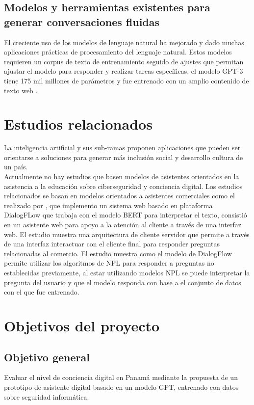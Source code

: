 \subsection{Modelos y herramientas existentes para generar conversaciones fluidas}\label{section: Revisión de la literatura}
El creciente uso de los modelos de lenguaje natural ha mejorado y dado muchas aplicaciones prácticas de procesamiento del lenguaje natural. Estos modelos requieren un corpus de texto de entrenamiento seguido de ajustes que permitan ajustar el modelo para responder y realizar tareas específicas, el modelo GPT-3 tiene 175 mil millones de parámetros y fue entrenado con un amplio contenido de texto web \cite{Autor-Nacional}.  
\section{Estudios relacionados}\label{section: Estudios relacionados}
La inteligencia artificial y sus sub-ramas proponen aplicaciones que pueden ser orientarse a soluciones para generar más inclusión social y desarrollo cultura de un país. \\
Actualmente no hay estudios que basen modelos de asistentes orientados en la asistencia a la educación sobre ciberseguridad y conciencia digital. Los estudios relacionados se basan en modelos orientados a asistentes comerciales como el realizado por \cite{Eleannor2022}, que implemento un sistema web basado en plataforma DialogFLow que trabaja con el modelo BERT para interpretar el texto, consistió en un asistente web para apoyo a la atención al cliente a través de una interfaz web. El estudio muestra una arquitectura de cliente servidor que permite a través de una interfaz interactuar con el cliente final para responder preguntas relacionadas al comercio. El estudio muestra como el modelo de DialogFlow permite utilizar los algoritmos de NPL para responder a preguntas no establecidas previamente, al estar utilizando modelos NPL se puede interpretar la pregunta del usuario y que el modelo responda con base a el conjunto de datos con el que fue entrenado.
\section{Objetivos del proyecto}\label{section:Objetivos del proyecto}
\subsection{Objetivo general}\label{section:Objetivos del proyecto}
Evaluar el nivel de conciencia digital en Panamá mediante la propuesta  de un prototipo de asistente digital basado en un modelo GPT, entrenado con datos sobre seguridad informática.
